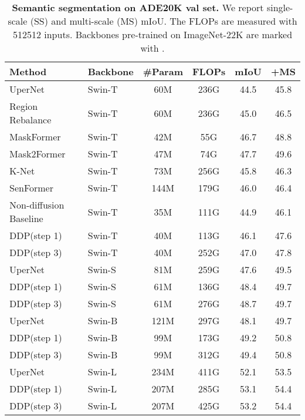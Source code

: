 \documentclass[10pt,twocolumn,letterpaper]{article}
\newcommand{\ours}[0]{DDP\xspace}
\begin{document}
\begin{table}[t]
\centering
\footnotesize
\renewcommand\arraystretch{1.05}
\setlength{\tabcolsep}{1.35mm}
\begin{tabular}{l|l|c|c|c|c}
    Method & Backbone  & \#Param & FLOPs  & mIoU & +MS \\
    \hline
    UperNet~\cite{xiao2018unified} & Swin-T & 60M & 236G & 44.5 & 45.8\\
    Region Rebalance~\cite{cui2022region} & Swin-T & 60M & 236G & 45.0 & 46.5\\
    MaskFormer~\cite{cheng2021per}  & Swin-T & 42M & 55G & 46.7 & 48.8 \\
    Mask2Former~\cite{cheng2022masked} & Swin-T & 47M & 74G & 47.7 & 49.6 \\    
    K-Net~\cite{zhang2021k} & Swin-T & 73M & 256G & 45.8 & 46.3\\
    SenFormer~\cite{bousselham2021efficient} & Swin-T & 144M & 179G & 46.0 & 46.4\\
    \rowcolor{gray!10} 
    Non-diffusion Baseline & Swin-T & 35M & 111G & 44.9 & 46.1 \\  
    \rowcolor{gray!10} 
    \ours (step 1) & Swin-T & 40M & 113G & 46.1 & 47.6 \\
    \rowcolor{gray!10} 
    \ours (step 3) & Swin-T & 40M & 252G & 47.0 & 47.8\\
    \hline
    UperNet~\cite{xiao2018unified} & Swin-S & 81M & 259G & 47.6 & 49.5\\ 
    \rowcolor{gray!10} 
    \ours (step 1) & Swin-S & 61M & 136G & 48.4 & 49.7 \\
    \rowcolor{gray!10} 
    \ours (step 3) & Swin-S & 61M & 276G & 48.7 & 49.7 \\
    \hline
    UperNet~\cite{xiao2018unified} & Swin-B & 121M & 297G & 48.1 & 49.7\\
    \rowcolor{gray!10} 
    \ours (step 1) & Swin-B & 99M & 173G & 49.2 & 50.8\\
    \rowcolor{gray!10} 
    \ours (step 3) & Swin-B & 99M & 312G & 49.4 & 50.8 \\
    \hline
    UperNet~\cite{xiao2018unified} & Swin-L & 234M & 411G & 52.1 & 53.5\\
    \rowcolor{gray!10} 
    \ours (step 1) & Swin-L & 207M & 285G & 53.1 & 54.4 \\
    \rowcolor{gray!10} 
    \ours (step 3) & Swin-L & 207M & 425G & 53.2 & 54.4 \\
    \end{tabular}
    \vspace{1em}
    \caption{\textbf{Semantic segmentation on ADE20K val set.}
    We report single-scale (SS) and multi-scale (MS) mIoU.
    The FLOPs are measured with 512512 inputs.
    Backbones pre-trained on ImageNet-22K are marked with .
    }
    \label{tab:result_ade20k}
\end{table}
\end{document}
